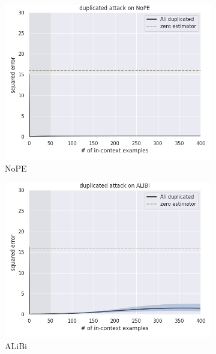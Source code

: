 \documentclass[letterpaper]{article} %
\begin{document}
\begin{figure}[tp]
    \centering
    \begin{subfigure}[t]{0.24\linewidth}
        \includegraphics[width=\linewidth]{AnonymousSubmission/LaTeX/imgs/analysis/nope_alldup.png}
        \caption{NoPE}
    \end{subfigure}
    \begin{subfigure}[t]{0.24\linewidth}
        \includegraphics[width=\linewidth]{AnonymousSubmission/LaTeX/imgs/analysis/alibi_alldup.png}
        \caption{ALiBi}
    \end{subfigure}
    \begin{subfigure}[t]{0.24\linewidth}

\end{subfigure}
\end{figure}
\end{document}

